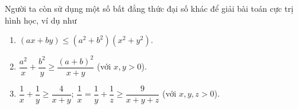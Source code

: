 \begin{vd}
{{}
	}
	\begin{note}{Người ta còn sử dụng một số bất đẳng thức đại số khác để giải bài toán cực trị hình học, ví dụ như
	\begin{enumerate}
	\item $(ax+by)\le \left(a^2+b^2\right)\left(x^2+y^2\right)$.
	\item $\dfrac{a^2}{x}+\dfrac{b^2}{y}\ge \dfrac{(a+b)^2}{x+y}$ (với $x,y >0$).
	\item $\dfrac{1}{x}+\dfrac{1}{y}\ge \dfrac{4}{x+y}$; $\dfrac{1}{x}=\dfrac{1}{y}+\dfrac{1}{z}\ge \dfrac{9}{x+y+z}$ (với $x, y, z>0$).
	\end{enumerate}}
	\end{note}
\end{vd}
